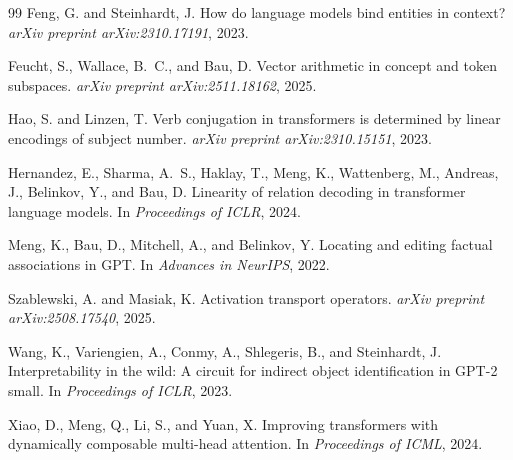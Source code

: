 \documentclass[11pt,a4paper]{article}
\begin{document}
\begin{thebibliography}{99}
Feng, G. and Steinhardt, J.
\newblock How do language models bind entities in context?
\newblock \emph{arXiv preprint arXiv:2310.17191}, 2023.

Feucht, S., Wallace, B.~C., and Bau, D.
\newblock Vector arithmetic in concept and token subspaces.
\newblock \emph{arXiv preprint arXiv:2511.18162}, 2025.

Hao, S. and Linzen, T.
\newblock Verb conjugation in transformers is determined by linear encodings of subject number.
\newblock \emph{arXiv preprint arXiv:2310.15151}, 2023.

Hernandez, E., Sharma, A.~S., Haklay, T., Meng, K., Wattenberg, M., Andreas, J.,
Belinkov, Y., and Bau, D.
\newblock Linearity of relation decoding in transformer language models.
\newblock In \emph{Proceedings of ICLR}, 2024.

Meng, K., Bau, D., Mitchell, A., and Belinkov, Y.
\newblock Locating and editing factual associations in {GPT}.
\newblock In \emph{Advances in NeurIPS}, 2022.

Szablewski, A. and Masiak, K.
\newblock Activation transport operators.
\newblock \emph{arXiv preprint arXiv:2508.17540}, 2025.

Wang, K., Variengien, A., Conmy, A., Shlegeris, B., and Steinhardt, J.
\newblock Interpretability in the wild: A circuit for indirect object identification in
{GPT-2} small.
\newblock In \emph{Proceedings of ICLR}, 2023.

Xiao, D., Meng, Q., Li, S., and Yuan, X.
\newblock Improving transformers with dynamically composable multi-head attention.
\newblock In \emph{Proceedings of ICML}, 2024.

\end{thebibliography}
\end{document}
